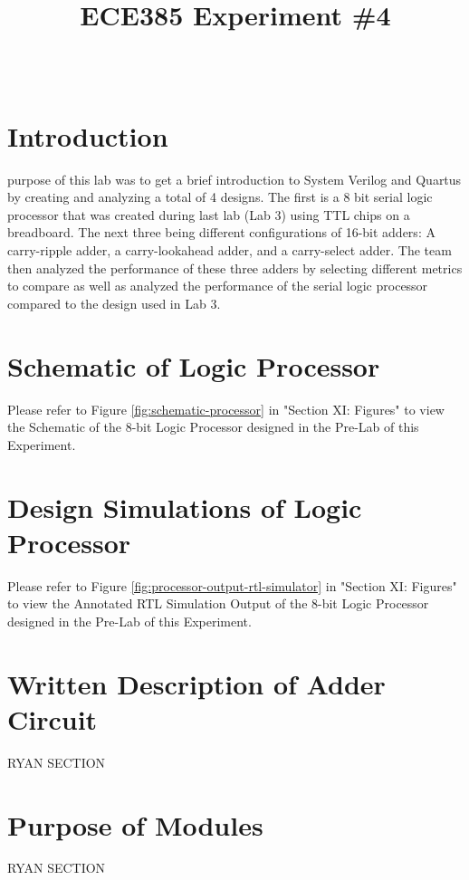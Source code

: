 \documentclass[journal, twocolumn, final,11pt,letterpaper]{IEEEtran}
\title{ECE385 Experiment \#4
	}
\author{
\IEEEauthorblockN{Eric Meyers, Ryan Helsdingen}\\
\IEEEauthorblockA{Section ABG; TAs: Ben Delay, Shuo Liu \\
February 17th, 2016 \\
emeyer7, helsdin2}}
\begin{document}
	
\maketitle
\singlespacing

\section{Introduction}
 purpose of this lab was to get a brief introduction to System Verilog and Quartus by creating and analyzing a total of 4 designs. The first is a 8 bit serial logic processor that was created during last lab (Lab 3) using TTL chips on a breadboard. The next three being different configurations of 16-bit adders: A carry-ripple adder, a carry-lookahead adder, and a carry-select adder. The team then analyzed the performance of these three adders by selecting different metrics to compare as well as analyzed the performance of the serial logic processor compared to the design used in Lab 3.

\section{Schematic of Logic Processor}
Please refer to Figure \ref{fig:schematic-processor} in "Section XI: Figures" to view the Schematic of the 8-bit Logic Processor designed in the Pre-Lab of this Experiment.

\section{Design Simulations of Logic Processor}
Please refer to Figure \ref{fig:processor-output-rtl-simulator} in "Section XI: Figures" to view the Annotated RTL Simulation Output of the 8-bit Logic Processor designed in the Pre-Lab of this Experiment.

\section{Written Description of Adder Circuit}
RYAN SECTION

\section{Purpose of Modules}
RYAN SECTION
\end{document}
